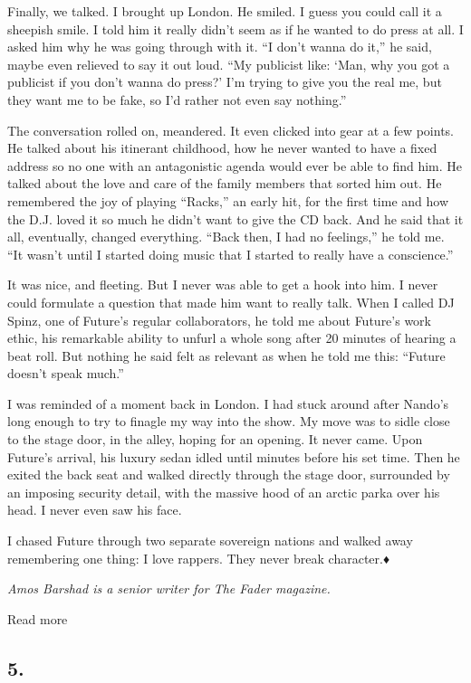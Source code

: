 Finally, we talked. I brought up London. He smiled. I guess you could
call it a sheepish smile. I told him it really didn't seem as if he
wanted to do press at all. I asked him why he was going through with it.
``I don't wanna do it,'' he said, maybe even relieved to say it out
loud. ``My publicist like: `Man, why you got a publicist if you don't
wanna do press?' I'm trying to give you the real me, but they want me to
be fake, so I'd rather not even say nothing.''

The conversation rolled on, meandered. It even clicked into gear at a
few points. He talked about his itinerant childhood, how he never wanted
to have a fixed address so no one with an antagonistic agenda would ever
be able to find him. He talked about the love and care of the family
members that sorted him out. He remembered the joy of playing ``Racks,''
an early hit, for the first time and how the D.J. loved it so much he
didn't want to give the CD back. And he said that it all, eventually,
changed everything. ``Back then, I had no feelings,'' he told me. ``It
wasn't until I started doing music that I started to really have a
conscience.''

It was nice, and fleeting. But I never was able to get a hook into him.
I never could formulate a question that made him want to really talk.
When I called DJ Spinz, one of Future's regular collaborators, he told
me about Future's work ethic, his remarkable ability to unfurl a whole
song after 20 minutes of hearing a beat roll. But nothing he said felt
as relevant as when he told me this: ``Future doesn't speak much.''

I was reminded of a moment back in London. I had stuck around after
Nando's long enough to try to finagle my way into the show. My move was
to sidle close to the stage door, in the alley, hoping for an opening.
It never came. Upon Future's arrival, his luxury sedan idled until
minutes before his set time. Then he exited the back seat and walked
directly through the stage door, surrounded by an imposing security
detail, with the massive hood of an arctic parka over his head. I never
even saw his face.

I chased Future through two separate sovereign nations and walked away
remembering one thing: I love rappers. They never break character.♦

\emph{Amos Barshad is a senior writer for The Fader magazine.}

Read more

\hypertarget{5}{%
\subsection{5.}\label{5}}

